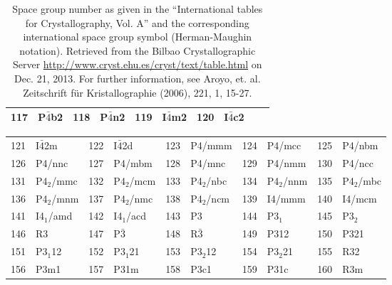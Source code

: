 \documentclass[final,12pt,makeidx,DIV=calc]{article}
\begin{document}
{{{{{{\begin{table}[h!]
\begin{center}
\begin{tabular}{||r|l||r|l||r|l||r|l||r|l||}
117    & P$\bar{4}$b2              & 
118    & P$\bar{4}$n2              & 
119    & I$\bar{4}$m2              & 
120    & I$\bar{4}$c2              \\
\hline
\end{tabular}
\end{center}
\caption{\label{table:spacegroupnumber_a}Space group number as given
  in the ``International tables for Crystallography, Vol. A'' and the
  corresponding international space group symbol (Herman-Maughin
  notation). Retrieved from the Bilbao Crystallographic Server
  \url{http://www.cryst.ehu.es/cryst/text/table.html} on Dec. 21,
  2013.  For further information, see Aroyo, et. al. Zeitschrift f\"ur
  Kristallographie (2006), 221, 1, 15-27.  }
\end{table}


\begin{table}[!h]
\begin{center}
\begin{tabular}{||r|l||r|l||r|l||r|l||r|l||}
\hline
121    & I$\bar{4}$2m              & 
122    & I$\bar{4}$2d              & 
123    & P4/mmm             & 
124    & P4/mcc             & 
125    & P4/nbm             \\
126    & P4/nnc             & 
127    & P4/mbm             & 
128    & P4/mnc             & 
129    & P4/nmm             & 
130    & P4/ncc             \\
131    & P4$_2$/mmc         & 
132    & P4$_2$/mcm         & 
133    & P4$_2$/nbc         & 
134    & P4$_2$/nnm         & 
135    & P4$_2$/mbc         \\
136    & P4$_2$/mnm         & 
137    & P4$_2$/nmc         & 
138    & P4$_2$/ncm         & 
139    & I4/mmm             & 
140    & I4/mcm             \\
141    & I4$_1$/amd         & 
142    & I4$_1$/acd         & 
143    & P3                 & 
144    & P3$_1$             & 
145    & P3$_2$             \\
146    & R3                 & 
147    & P$\bar{3}$         & 
148    & R$\bar{3}$         & 
149    & P312               & 
150    & P321               \\
151    & P3$_1$12           & 
152    & P3$_1$21           & 
153    & P3$_2$12           & 
154    & P3$_2$21           & 
155    & R32                \\
156    & P3m1               & 
157    & P31m               & 
158    & P3c1               & 
159    & P31c               & 
160    & R3m                \\

\end{tabular}
\end{center}
\end{table}}}}}}}
\end{document}
